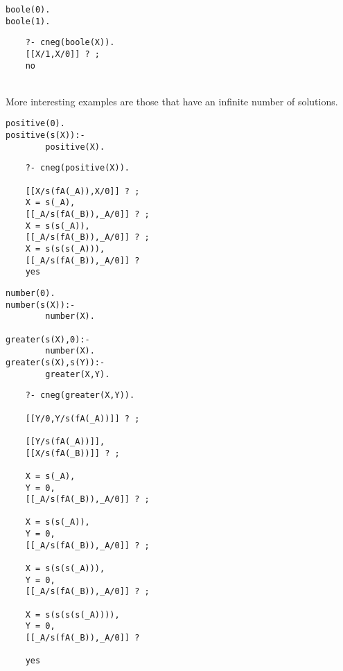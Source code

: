 \documentclass{llncs}
\begin{document}
\begin{minipage}{2in}
\begin{verbatim}
boole(0).
boole(1).
\end{verbatim}
\end{minipage}
\begin{minipage}{2in}
\begin{verbatim} 
    ?- cneg(boole(X)).
    [[X/1,X/0]] ? ;
    no
\end{verbatim} 
\end{minipage}\\

More interesting examples are those that have an infinite number of
solutions.

\begin{minipage}{2in}
\begin{verbatim}
positive(0). 
positive(s(X)):-
        positive(X).  
\end{verbatim}
\end{minipage}
\begin{minipage}{2in}
\begin{verbatim} 
    ?- cneg(positive(X)).

    [[X/s(fA(_A)),X/0]] ? ;
    X = s(_A),
    [[_A/s(fA(_B)),_A/0]] ? ;
    X = s(s(_A)),
    [[_A/s(fA(_B)),_A/0]] ? ;
    X = s(s(s(_A))),
    [[_A/s(fA(_B)),_A/0]] ? 
    yes
\end{verbatim} 
\end{minipage}

\begin{minipage}{2in}
\begin{verbatim}
number(0).
number(s(X)):-
        number(X).

greater(s(X),0):-
        number(X).
greater(s(X),s(Y)):-
        greater(X,Y).
\end{verbatim}
\end{minipage}
\begin{minipage}{2in}
\begin{verbatim} 
    ?- cneg(greater(X,Y)).

    [[Y/0,Y/s(fA(_A))]] ? ;

    [[Y/s(fA(_A))]],
    [[X/s(fA(_B))]] ? ;

    X = s(_A),
    Y = 0,
    [[_A/s(fA(_B)),_A/0]] ? ;

    X = s(s(_A)),
    Y = 0,
    [[_A/s(fA(_B)),_A/0]] ? ;

    X = s(s(s(_A))),
    Y = 0,
    [[_A/s(fA(_B)),_A/0]] ? ;

    X = s(s(s(s(_A)))),
    Y = 0,
    [[_A/s(fA(_B)),_A/0]] ? 

    yes
\end{verbatim} 
\end{minipage}
\end{document}
